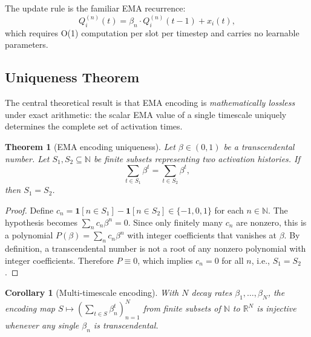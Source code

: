 \documentclass[11pt]{article}
\newtheorem{theorem}{Theorem}
\newtheorem{corollary}{Corollary}
\begin{document}
The update rule is the familiar EMA recurrence:
\begin{equation}
Q_i^{(n)}(t) = \beta_n \cdot Q_i^{(n)}(t-1) + x_i(t),
\end{equation}
which requires O(1) computation per slot per timestep and carries no learnable parameters.

\subsection{Uniqueness Theorem}

The central theoretical result is that EMA encoding is \emph{mathematically lossless} under exact arithmetic: the scalar EMA value of a single timescale uniquely determines the complete set of activation times.

\begin{theorem}[EMA encoding uniqueness]
\label{thm:unique}
Let $\beta \in (0,1)$ be a transcendental number. Let $S_1, S_2 \subseteq \mathbb{N}$ be finite subsets representing two activation histories. If
\begin{equation}
\sum_{t \in S_1} \beta^t = \sum_{t \in S_2} \beta^t,
\end{equation}
then $S_1 = S_2$.
\end{theorem}

\begin{proof}
Define $c_n = \mathbf{1}[n \in S_1] - \mathbf{1}[n \in S_2] \in \{-1, 0, 1\}$ for each $n \in \mathbb{N}$. The hypothesis becomes $\sum_n c_n \beta^n = 0$. Since only finitely many $c_n$ are nonzero, this is a polynomial $P(\beta) = \sum_n c_n \beta^n$ with integer coefficients that vanishes at $\beta$. By definition, a transcendental number is not a root of any nonzero polynomial with integer coefficients. Therefore $P \equiv 0$, which implies $c_n = 0$ for all $n$, i.e., $S_1 = S_2$.
\end{proof}

\begin{corollary}[Multi-timescale encoding]
With $N$ decay rates $\beta_1, \dots, \beta_N$, the encoding map $S \mapsto (\sum_{t \in S} \beta_n^t)_{n=1}^N$ from finite subsets of $\mathbb{N}$ to $\mathbb{R}^N$ is injective whenever any single $\beta_n$ is transcendental.
\end{corollary}
\end{document}
